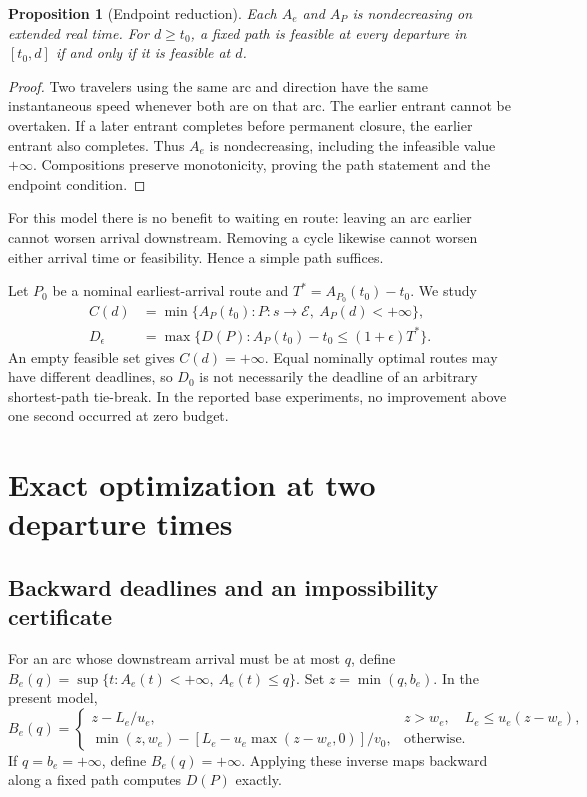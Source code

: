 \documentclass[11pt]{article}
\newtheorem{proposition}{Proposition}
\newcommand{\E}{\mathcal E}
\newcommand{\infv}{+\infty}
\begin{document}
\begin{proposition}[Endpoint reduction]
\label{prop:endpoint}
Each $A_e$ and $A_P$ is nondecreasing on extended real time. For $d\ge t_0$, a fixed path is feasible at every departure in $[t_0,d]$ if and only if it is feasible at $d$.
\end{proposition}
\begin{proof}
Two travelers using the same arc and direction have the same instantaneous speed whenever both are on that arc. The earlier entrant cannot be overtaken. If a later entrant completes before permanent closure, the earlier entrant also completes. Thus $A_e$ is nondecreasing, including the infeasible value $\infv$. Compositions preserve monotonicity, proving the path statement and the endpoint condition.
\end{proof}
For this model there is no benefit to waiting en route: leaving an arc earlier cannot worsen arrival downstream. Removing a cycle likewise cannot worsen either arrival time or feasibility. Hence a simple path suffices.

Let $P_0$ be a nominal earliest-arrival route and $T^*=A_{P_0}(t_0)-t_0$. We study
\begin{align}
 C(d)&=\min\{A_P(t_0):P:s\to\E,\ A_P(d)<\infv\}, \label{eq:C}\\
 D_\epsilon&=\max\{D(P):A_P(t_0)-t_0\le(1+\epsilon)T^*\}.
 \label{eq:budget}
\end{align}
An empty feasible set gives $C(d)=\infv$. Equal nominally optimal routes may have different deadlines, so $D_0$ is not necessarily the deadline of an arbitrary shortest-path tie-break. In the reported base experiments, no improvement above one second occurred at zero budget.

\section{Exact optimization at two departure times}
\subsection{Backward deadlines and an impossibility certificate}
For an arc whose downstream arrival must be at most $q$, define
$B_e(q)=\sup\{t:A_e(t)<\infv,\ A_e(t)\le q\}$.
Set $z=\min(q,b_e)$. In the present model,
\begin{equation}
 B_e(q)=
 \begin{cases}
 z-L_e/u_e,&z>w_e,\quad L_e\le u_e(z-w_e),\\
 \min(z,w_e)-[L_e-u_e\max(z-w_e,0)]/v_0,&\text{otherwise}.
 \end{cases}
 \label{eq:inverse}
\end{equation}
If $q=b_e=\infv$, define $B_e(q)=\infv$.
Applying these inverse maps backward along a fixed path computes $D(P)$ exactly.
\end{document}
